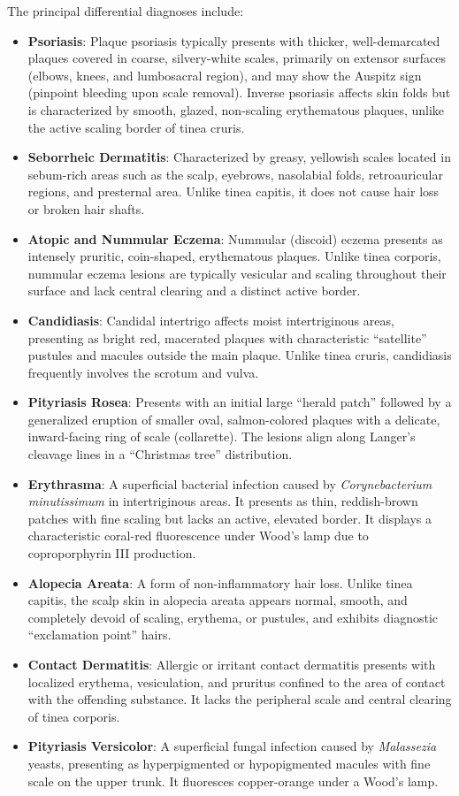The principal differential diagnoses include:
\begin{itemize}
    \item \textbf{Psoriasis}: Plaque psoriasis typically presents with thicker, well-demarcated plaques covered in coarse, silvery-white scales, primarily on extensor surfaces (elbows, knees, and lumbosacral region), and may show the Auspitz sign (pinpoint bleeding upon scale removal). Inverse psoriasis affects skin folds but is characterized by smooth, glazed, non-scaling erythematous plaques, unlike the active scaling border of tinea cruris.
    \item \textbf{Seborrheic Dermatitis}: Characterized by greasy, yellowish scales located in sebum-rich areas such as the scalp, eyebrows, nasolabial folds, retroauricular regions, and presternal area. Unlike tinea capitis, it does not cause hair loss or broken hair shafts.
    \item \textbf{Atopic and Nummular Eczema}: Nummular (discoid) eczema presents as intensely pruritic, coin-shaped, erythematous plaques. Unlike tinea corporis, nummular eczema lesions are typically vesicular and scaling throughout their surface and lack central clearing and a distinct active border.
    \item \textbf{Candidiasis}: Candidal intertrigo affects moist intertriginous areas, presenting as bright red, macerated plaques with characteristic ``satellite'' pustules and macules outside the main plaque. Unlike tinea cruris, candidiasis frequently involves the scrotum and vulva.
    \item \textbf{Pityriasis Rosea}: Presents with an initial large ``herald patch'' followed by a generalized eruption of smaller oval, salmon-colored plaques with a delicate, inward-facing ring of scale (collarette). The lesions align along Langer's cleavage lines in a ``Christmas tree'' distribution.
    \item \textbf{Erythrasma}: A superficial bacterial infection caused by \textit{Corynebacterium minutissimum} in intertriginous areas. It presents as thin, reddish-brown patches with fine scaling but lacks an active, elevated border. It displays a characteristic coral-red fluorescence under Wood's lamp due to coproporphyrin III production.
    \item \textbf{Alopecia Areata}: A form of non-inflammatory hair loss. Unlike tinea capitis, the scalp skin in alopecia areata appears normal, smooth, and completely devoid of scaling, erythema, or pustules, and exhibits diagnostic ``exclamation point'' hairs.
    \item \textbf{Contact Dermatitis}: Allergic or irritant contact dermatitis presents with localized erythema, vesiculation, and pruritus confined to the area of contact with the offending substance. It lacks the peripheral scale and central clearing of tinea corporis.
    \item \textbf{Pityriasis Versicolor}: A superficial fungal infection caused by \textit{Malassezia} yeasts, presenting as hyperpigmented or hypopigmented macules with fine scale on the upper trunk. It fluoresces copper-orange under a Wood's lamp.
\end{itemize}

